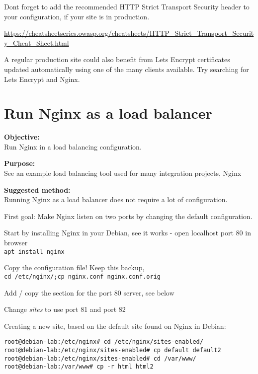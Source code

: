 \documentclass[a4paper,11pt,notitlepage]{report}
\begin{document}
Dont forget to add the recommended HTTP Strict Transport Security header to your configuration, if your site is in production.

{\footnotesize\url{https://cheatsheetseries.owasp.org/cheatsheets/HTTP_Strict_Transport_Security_Cheat_Sheet.html}}

A regular production site could also benefit from Lets Encrypt certificates updated automatically using one of the many clients available. Try searching for Lets Encrypt and Nginx.

\chapter{Run Nginx as a load balancer}
\label{ex:nginx-loadbalancer}


{\bf Objective:}\\
Run Nginx in a load balancing configuration.

{\bf Purpose:}\\
See an example load balancing tool used for many integration projects, Nginx

{\bf Suggested method:}\\
Running Nginx as a load balancer does not require a lot of configuration.

First goal: Make Nginx listen on two ports by changing the default configuration.

\begin{list2}
\item Start by installing Nginx in your Debian, see it works - open localhost port 80 in browser\\
\verb+apt install nginx+
\item Copy the configuration file! Keep this backup,\\
\verb+cd /etc/nginx/;cp nginx.conf nginx.conf.orig+
\item Add / copy the section for the port 80 server, see below
\item Change \emph{sites} to use port 81 and port 82
\end{list2}


Creating a new site, based on the default site found on Nginx in Debian:
\begin{verbatim}
root@debian-lab:/etc/nginx# cd /etc/nginx/sites-enabled/
root@debian-lab:/etc/nginx/sites-enabled# cp default default2
root@debian-lab:/etc/nginx/sites-enabled# cd /var/www/
root@debian-lab:/var/www# cp -r html html2
\end{verbatim}
\end{document}
